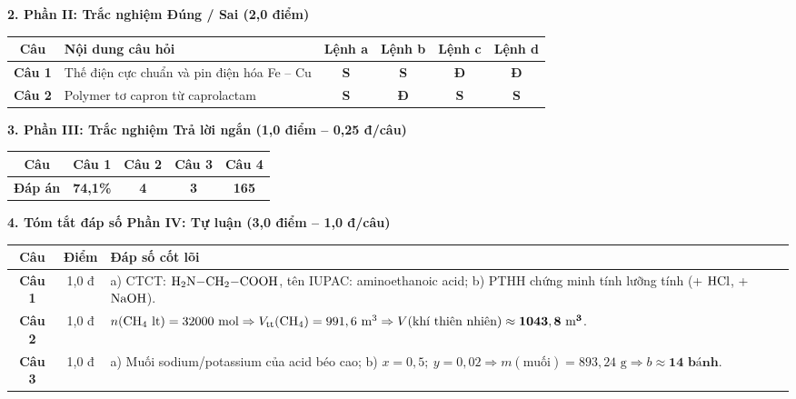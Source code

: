 \documentclass[11pt,a4paper]{article}
\begin{document}
\vspace{2pt}
\noindent
\textbf{\color{mainGreen}2. Phần II: Trắc nghiệm Đúng / Sai (2,0 điểm)}
\begin{center}
\renewcommand{\arraystretch}{1.2}
\begin{tabular}{|c|p{7.5cm}|c|c|c|c|}
\hline
\rowcolor{tableGreen}
\textbf{Câu} & \textbf{Nội dung câu hỏi} & \textbf{Lệnh a} & \textbf{Lệnh b} & \textbf{Lệnh c} & \textbf{Lệnh d} \\
\hline
\textbf{Câu 1} & Thế điện cực chuẩn và pin điện hóa Fe -- Cu & \textbf{\color{gray}S} & \textbf{\color{gray}S} & \textbf{\color{hfRed}Đ} & \textbf{\color{hfRed}Đ} \\
\hline
\textbf{Câu 2} & Polymer tơ capron từ caprolactam & \textbf{\color{gray}S} & \textbf{\color{hfRed}Đ} & \textbf{\color{gray}S} & \textbf{\color{gray}S} \\
\hline
\end{tabular}
\end{center}

\vspace{2pt}
\noindent
\textbf{\color{mainGreen}3. Phần III: Trắc nghiệm Trả lời ngắn (1,0 điểm -- 0,25 đ/câu)}
\begin{center}
\renewcommand{\arraystretch}{1.2}
\begin{tabular}{|c|c|c|c|c|}
\hline
\rowcolor{tableGreen}
\textbf{Câu} & \textbf{Câu 1} & \textbf{Câu 2} & \textbf{Câu 3} & \textbf{Câu 4} \\
\hline
\textbf{Đáp án} & \textbf{\color{hfRed}74,1\%} & \textbf{\color{hfRed}4} & \textbf{\color{hfRed}3} & \textbf{\color{hfRed}165} \\
\hline
\end{tabular}
\end{center}

\vspace{2pt}
\noindent
\textbf{\color{mainGreen}4. Tóm tắt đáp số Phần IV: Tự luận (3,0 điểm -- 1,0 đ/câu)}
\begin{center}
\renewcommand{\arraystretch}{1.2}
\begin{tabular}{|c|c|p{11.5cm}|}
\hline
\rowcolor{tableGreen}
\textbf{Câu} & \textbf{Điểm} & \textbf{Đáp số cốt lõi} \\
\hline
\textbf{Câu 1} & 1,0 đ & a) CTCT: $\ce{H2N-CH2-COOH}$, tên IUPAC: aminoethanoic acid; b) PTHH chứng minh tính lưỡng tính (+ $\ce{HCl}$, + $\ce{NaOH}$). \\
\hline
\textbf{Câu 2} & 1,0 đ & $n(\ce{CH4}\text{ lt}) = 32000\text{ mol} \Rightarrow V_\text{tt}(\ce{CH4}) = 991,6\text{ m}^3 \Rightarrow V(\text{khí thiên nhiên}) \approx \mathbf{1043,8\text{ m}^3}$. \\
\hline
\textbf{Câu 3} & 1,0 đ & a) Muối sodium/potassium của acid béo cao; b) $x = 0,5;\ y = 0,02 \Rightarrow m(\text{muối}) = 893,24\text{ g} \Rightarrow b \approx \mathbf{14\text{ bánh}}$. \\
\hline
\end{tabular}
\end{center}
\end{document}
